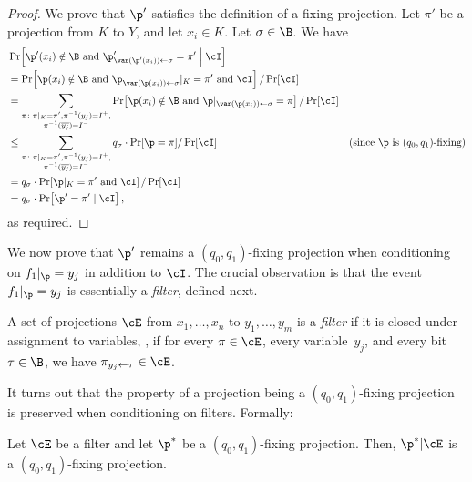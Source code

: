 \documentclass{toc}
\begin{document}
\begin{proof}
We prove that $\p'$ satisfies the definition of a fixing projection.
Let $\pi'$ be a projection from $K$ to $Y$, and let $x_{i}\in K$.
Let $\sigma\in\B$. We have 
\begin{align*}
 & \Pr\!\left[\p'(x_{i})\notin\B\text{ and }\p'_{\var(\p'(x_{i}))\gets\sigma}=\pi'\;\middle|\;\cI\right]\\
 & =\Pr\!\left[\p(x_{i})\notin\B\text{ and }\p_{\var(\p(x_{i}))\gets\sigma}|_{K}=\pi'\text{ and }\cI\right]/\Pr\!\left[\cI\right]\\
 & =\sum_{\substack{\pi\colon\pi|_{K}=\pi',\pi^{-1}(y_{j})=I^{+},\\
\pi^{-1}(\overline{y_{j}})=I^{-}
}
}\Pr\!\left[\p(x_{i})\notin\B\text{ and }\p|_{\var(\p(x_{i}))\gets\sigma}=\pi\right]/\Pr\!\left[\cI\right]\\
 & \le\sum_{\substack{\pi\colon\pi|_{K}=\pi',\pi^{-1}(y_{j})=I^{+},\\
\pi^{-1}(\overline{y_{j}})=I^{-}
}
}q_{\sigma}\cdot\Pr[\p=\pi]/\Pr\!\left[\cI\right] & \text{(since \ensuremath{\p} is \ensuremath{(q_{0},q_{1})}-fixing)}\\
 & =q_{\sigma}\cdot\Pr\!\left[\p|_{K}=\pi'\text{ and }\cI\right]/\Pr\!\left[\cI\right]\\
 & =q_{\sigma}\cdot\Pr\!\left[\p'=\pi'\mid\cI\right],
\end{align*}
as required. 
\end{proof}
We now prove that $\p'$ remains a $(q_{0},q_{1})$-fixing projection
when conditioning on $f_{1}|_{\p}=y_{j}$ in addition to $\cI$. The
crucial observation is that the event $f_{1}|_{\p}=y_{j}$ is essentially
a \emph{filter}, defined next. 
\begin{definition}
A set of projections $\cE$ from $x_{1},\ldots,x_{n}$ to $y_{1},\ldots,y_{m}$
is a \emph{filter} if it is closed under assignment to variables,
\ie, if for every $\pi\in\cE$, every variable~$y_{j}$, and every
bit~$\tau\in\B$, we have $\pi_{y_{j}\gets\tau}\in\cE$. 
\end{definition}

It turns out that the property of a projection being a $(q_{0},q_{1})$-fixing
projection is preserved when conditioning on filters. Formally: 
\begin{proposition}
\label{prop:conditioning-on-a-filter}Let $\cE$ be a filter and let $\p^{*}$
be a $(q_{0},q_{1})$-fixing projection. Then, $\p^{*}|\cE$ is a
$(q_{0},q_{1})$-fixing projection. 
\end{proposition}
\end{document}
